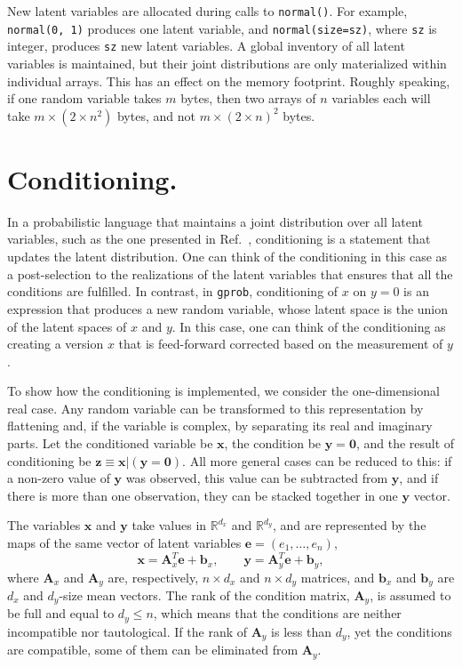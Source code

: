 \documentclass[a4paper,notitlepage]{article}
\renewcommand{\b}[1]{\mathbf{#1}}
\begin{document}
New latent variables are allocated during calls to \texttt{normal()}. For example, \texttt{normal(0, 1)} produces one latent variable, and \texttt{normal(size=sz)}, where \texttt{sz} is integer, produces \texttt{sz} new latent variables. A global inventory of all latent variables is maintained, but their joint distributions are only materialized within individual arrays. This has an effect on the memory footprint. Roughly speaking, if one random variable takes $m$ bytes, then two arrays of $n$ variables each will take $m\times(2\times n^2)$ bytes, and not $m\times (2\times n)^2$ bytes. 


\section{Conditioning.}
\label{sec:conditioning}

In a probabilistic language that maintains a joint distribution over all latent variables, such as the one presented in Ref.~\cite{stein_compositional_2021}, conditioning is a statement that updates the latent distribution. One can think of the conditioning in this case as a post-selection to the realizations of the latent variables that ensures that all the conditions are fulfilled. In contrast, in \texttt{gprob}, conditioning of $x$ on $y=0$ is an expression that produces a new random variable, whose latent space is the union of the latent spaces of $x$ and $y$. 
In this case, one can think of the conditioning as creating a version $x$ that is feed-forward corrected based on the measurement of $y$.


To show how the conditioning is implemented, we consider the one-dimensional real case. Any random variable can be transformed to this representation by flattening and, if the variable is complex, by separating its real and imaginary parts. Let the conditioned variable be $\b{x}$, the condition be $\b{y}=\b{0}$, and the result of conditioning be $\b{z}\equiv\b{x}|(\b{y}=\b{0})$. All more general cases can be reduced to this: if a non-zero value of $\b{y}$ was observed, this value can be subtracted from $\b{y}$, and if there is more than one observation, they can be stacked together in one $\b{y}$ vector.

The variables $\b{x}$ and $\b{y}$ take values in $\mathbb{R}^{d_x}$ and $\mathbb{R}^{d_y}$, and are represented by the maps of the same vector of latent variables $\b{e}=(e_1,\ldots,e_n)$,
\begin{equation}
\b{x}=\b{A}_x^T\b{e} + \b{b}_x,\qquad
\b{y}=\b{A}_y^T\b{e} + \b{b}_y,
\end{equation}
where $\b{A}_x$ and $\b{A}_y$ are, respectively, $n\times d_x$ and $n\times d_y$ matrices, and $\b{b}_x$ and $\b{b}_y$ are $d_x$ and $d_y$-size mean vectors. The rank of the condition matrix, $\b{A}_y$, is assumed to be full and equal to $d_y\le n$, which means that the conditions are neither incompatible nor tautological. If the rank of $\b{A}_y$ is less than $d_y$, yet the conditions are compatible, some of them can be eliminated from $\b{A}_y$.
\end{document}
